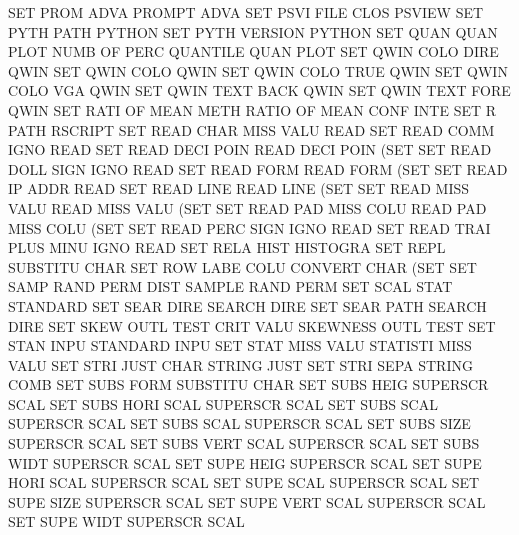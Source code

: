 SET      PROM ADVA                      PROMPT   ADVA
SET      PSVI FILE CLOS                 PSVIEW
SET      PYTH PATH                      PYTHON
SET      PYTH VERSION                   PYTHON
SET      QUAN QUAN PLOT NUMB OF   PERC  QUANTILE QUAN PLOT
SET      QWIN COLO DIRE                 QWIN
SET      QWIN COLO                      QWIN
SET      QWIN COLO TRUE                 QWIN
SET      QWIN COLO VGA                  QWIN
SET      QWIN TEXT BACK                 QWIN
SET      QWIN TEXT FORE                 QWIN
SET      RATI OF   MEAN METH            RATIO   OF    MEAN CONF INTE
SET      R    PATH                      RSCRIPT
SET      READ CHAR MISS VALU            READ
SET      READ COMM IGNO                 READ
SET      READ DECI POIN                 READ     DECI POIN (SET
SET      READ DOLL SIGN IGNO            READ
SET      READ FORM                      READ     FORM (SET
SET      READ IP   ADDR                 READ
SET      READ LINE                      READ     LINE (SET
SET      READ MISS VALU                 READ     MISS VALU (SET
SET      READ PAD  MISS COLU            READ     PAD  MISS COLU (SET
SET      READ PERC SIGN IGNO            READ
SET      READ TRAI PLUS MINU IGNO       READ
SET      RELA HIST                      HISTOGRA
SET      REPL                           SUBSTITU CHAR
SET      ROW  LABE COLU                 CONVERT  CHAR (SET
SET      SAMP RAND PERM DIST            SAMPLE   RAND PERM
SET      SCAL STAT                      STANDARD
SET      SEAR DIRE                      SEARCH   DIRE
SET      SEAR PATH                      SEARCH   DIRE
SET      SKEW OUTL TEST CRIT VALU       SKEWNESS OUTL TEST
SET      STAN INPU                      STANDARD INPU
SET      STAT MISS VALU                 STATISTI MISS VALU
SET      STRI JUST CHAR                 STRING   JUST
SET      STRI SEPA                      STRING   COMB
SET      SUBS FORM                      SUBSTITU CHAR
SET      SUBS HEIG                      SUPERSCR SCAL
SET      SUBS HORI SCAL                 SUPERSCR SCAL
SET      SUBS SCAL                      SUPERSCR SCAL
SET      SUBS SCAL                      SUPERSCR SCAL
SET      SUBS SIZE                      SUPERSCR SCAL
SET      SUBS VERT SCAL                 SUPERSCR SCAL
SET      SUBS WIDT                      SUPERSCR SCAL
SET      SUPE HEIG                      SUPERSCR SCAL
SET      SUPE HORI SCAL                 SUPERSCR SCAL
SET      SUPE SCAL                      SUPERSCR SCAL
SET      SUPE SIZE                      SUPERSCR SCAL
SET      SUPE VERT SCAL                 SUPERSCR SCAL
SET      SUPE WIDT                      SUPERSCR SCAL
